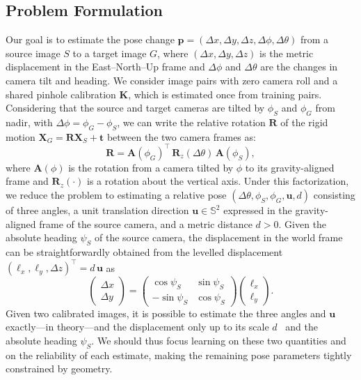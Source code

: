 \subsection{Problem Formulation}\label{PoseRep}
Our goal is to estimate the pose change $\mathbf{p}=(\Delta x,\Delta y,\Delta z,\Delta\phi,\Delta\theta)$ from a source image $S$ to a target image $G$, where $(\Delta x,\Delta y,\Delta z)$ is the metric displacement in the East--North--Up frame and $\Delta\phi$ and $\Delta\theta$ are the changes in camera tilt and heading. We consider image pairs with zero camera roll and a shared pinhole calibration $\mathbf{K}$, which is estimated once from training pairs. Considering that the source and target cameras are tilted by $\phi_S$ and $\phi_G$ from nadir, with $\Delta\phi=\phi_G-\phi_S$, we can write the relative rotation $\mathbf{R}$ of the rigid motion $\mathbf{X}_G=\mathbf{R}\mathbf{X}_S+\mathbf{t}$ between the two camera frames as:
\begin{equation}
\mathbf{R}=\mathbf{A}(\phi_G)^{\top}\,\mathbf{R}_z(\Delta\theta)\,\mathbf{A}(\phi_S),
\label{eq:rot}
\end{equation}
where $\mathbf{A}(\phi)$ is the rotation from a camera tilted by $\phi$ to its gravity-aligned frame and $\mathbf{R}_z(\cdot)$ is a rotation about the vertical axis. Under this factorization, we reduce the problem to estimating a relative pose $(\Delta\theta,\phi_S,\phi_G,\mathbf{u},d)$ consisting of three angles, a unit translation direction $\mathbf{u}\in\mathbb{S}^2$ expressed in the gravity-aligned frame of the source camera, and a metric distance $d>0$. Given the absolute heading $\psi_S$ of the source camera, the displacement in the world frame can be straightforwardly obtained from the levelled displacement $(\ell_x,\ell_y,\Delta z)^\top=d\,\mathbf{u}$ as
\begin{equation}
\begin{pmatrix}\Delta x\\ \Delta y\end{pmatrix}=
\begin{pmatrix}\cos\psi_S & \sin\psi_S\\ -\sin\psi_S & \cos\psi_S\end{pmatrix}
\begin{pmatrix}\ell_x\\ \ell_y\end{pmatrix}.
\label{eq:world}
\end{equation}
Given two calibrated images, it is possible to estimate the three angles and $\mathbf{u}$ exactly---in theory---and the displacement only up to its scale $d$~\citep{hartley2003multiple} and the absolute heading $\psi_S$. We should thus focus learning on these two quantities and on the reliability of each estimate, making the remaining pose parameters tightly constrained by geometry.
